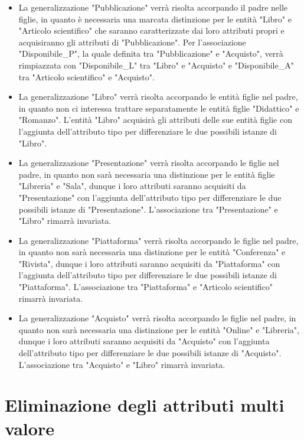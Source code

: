     \begin{itemize}
        \item La generalizzazione "Pubblicazione" verrà risolta accorpando il padre nelle figlie, in quanto è necessaria una marcata distinzione per le entità "Libro" e "Articolo scientifico" che saranno caratterizzate dai loro  attributi propri e acquisiranno gli attributi di "Pubblicazione". Per l'associazione "Disponibile\_P", la quale definita tra "Pubblicazione" e "Acquisto", verrà rimpiazzata con "Disponibile\_L" tra "Libro" e "Acquisto" e "Disponibile\_A" tra "Articolo scientifico" e "Acquisto".
        \item La generalizzazione "Libro" verrà risolta accorpando le entità figlie nel padre, in quanto non ci interessa trattare separatamente le entità figlie "Didattico" e "Romanzo". L'entità "Libro" acquisirà gli attributi delle sue entità figlie con l'aggiunta dell'attributo tipo per differenziare le due possibili istanze di "Libro". 
        \item La generalizzazione "Presentazione" verrà risolta accorpando le figlie nel padre, in quanto non sarà necessaria una distinzione per le entità figlie "Libreria" e "Sala", dunque  i loro attributi saranno acquisiti da "Presentazione" con l'aggiunta dell'attributo tipo per differenziare le due possibili istanze di "Presentazione". L'associazione tra "Presentazione" e "Libro" rimarrà invariata.
        \item  La generalizzazione "Piattaforma" verrà risolta accorpando le figlie nel padre, in quanto non sarà necessaria una distinzione per le entità "Conferenza" e "Rivista", dunque  i loro attributi saranno acquisiti da "Piattaforma" con l'aggiunta dell'attributo tipo per differenziare le due possibili istanze di "Piattaforma". L'associazione tra "Piattaforma" e "Articolo scientifico" rimarrà invariata.
        \item  La generalizzazione "Acquisto" verrà risolta accorpando le figlie nel padre, in quanto non sarà necessaria una distinzione per le entità "Online" e "Libreria", dunque  i loro attributi saranno acquisiti da "Acquisto" con l'aggiunta dell'attributo tipo per differenziare le due possibili istanze di "Acquisto". L'associazione tra "Acquisto" e "Libro" rimarrà invariata.
    \end{itemize}


    

    \section{Eliminazione degli attributi multi valore}

